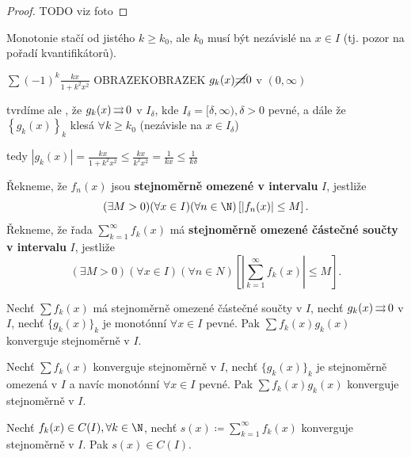 \begin{proof}
    TODO viz foto
\end{proof}

\begin{poznamka}
    Monotonie stačí od jistého $k \geq k_0$, ale $k_0$ musí být nezávislé na $x\in I$ (tj. pozor na pořadí kvantifikátorů).
\end{poznamka}

\begin{priklad}
    $\sum (-1)^k \frac{kx}{1+k^2x^2}$
    OBRAZEKOBRAZEK
    $g_k(x)\cancel{\operatorname{\rightrightarrows}}0$ v $(0, \infty)$

    tvrdíme ale , že $g_k(x)\operatorname{\rightrightarrows} 0$ v $I_\delta$, kde $I_\delta = [\delta,\infty), \delta>0$ pevné, a dále že $\left\{g_k(x)\right\}_k$ klesá $\forall k \geq k_0$ (nezávisle na $x\in I_\delta$)

    tedy $|g_k(x)|=\frac{kx}{1+k^2x^2}\leq \frac{kx}{k^2x^2}=\frac{1}{kx}\leq \frac{1}{k\delta}$
\end{priklad}

\begin{definice}
  Řekneme, že $f_n(x)$ jsou \textbf{stejnoměrně omezené v intervalu} $I$, jestliže
  $$(\exists M>0)(\forall x \in I)(\forall n \in \N)\left[\left|f_n(x)\right|\leq M\right].$$
  Řekneme, že řada $\sum_{k=1}^\infty f_k(x)$ má \textbf{stejnoměrně omezené částečné součty v intervalu} $I$, jestliže
  $$(\exists M >0)(\forall x \in I)(\forall n \in N)\left[\left|\sum_{k=1}^\infty f_k(x)\right|\leq M\right].$$
\end{definice}

\begin{veta}
  Nechť $\sum f_k(x)$ má stejnoměrně omezené částečné součty v $I$, nechť $g_k(x) \operatorname{\rightrightarrows} 0$ v $I$, nechť $\{g_k(x)\}_k$ je monotónní $\forall x \in I$ pevné. Pak $\sum f_k(x)g_k(x)$ konverguje stejnoměrně v $I$.
\end{veta}

\begin{veta}
  Nechť $\sum f_k(x)$ konverguje stejnoměrně v $I$, nechť $\{g_k(x)\}_k$ je stejnoměrně omezená v $I$ a navíc monotónní $\forall x \in I$ pevné. Pak $\sum f_k(x)g_k(x)$ konverguje stejnoměrně v $I$.
\end{veta}

\begin{veta}
  Nechť $f_k(x) \in C(I), \forall k \in \N$, nechť $s(x) \coloneq \sum_{k=1}^\infty f_k(x)$ konverguje stejnoměrně v $I$. Pak $s(x) \in C(I)$.
\end{veta}

